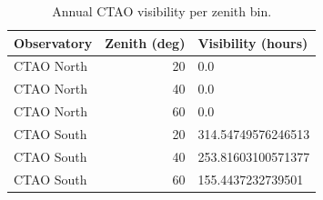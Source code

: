 \begin{table}
\caption{Annual CTAO visibility per zenith bin.}
\label{tab:ctao_visibility}
\begin{tabular}{lrl}
\toprule
Observatory & Zenith (deg) & Visibility (hours) \\
\midrule
CTAO North & 20 & 0.0 \\
CTAO North & 40 & 0.0 \\
CTAO North & 60 & 0.0 \\
CTAO South & 20 & 314.54749576246513 \\
CTAO South & 40 & 253.81603100571377 \\
CTAO South & 60 & 155.4437232739501 \\
\bottomrule
\end{tabular}
\end{table}
